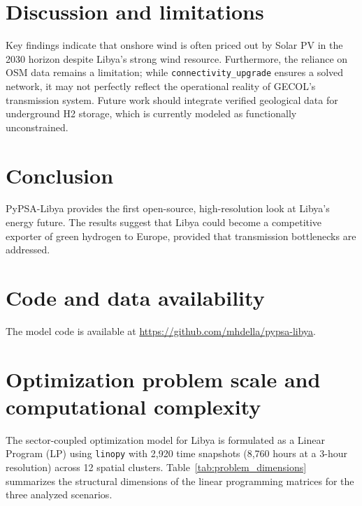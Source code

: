 \documentclass[preprint,12pt]{elsarticle}
\begin{document}
\section{Discussion and limitations}
Key findings indicate that onshore wind is often priced out by Solar PV in the 2030 horizon despite Libya's strong wind resource. Furthermore, the reliance on OSM data remains a limitation; while \texttt{connectivity\_upgrade} ensures a solved network, it may not perfectly reflect the operational reality of GECOL's transmission system. Future work should integrate verified geological data for underground H2 storage, which is currently modeled as functionally unconstrained.


\section{Conclusion}
PyPSA-Libya provides the first open-source, high-resolution look at Libya’s energy future. The results suggest that Libya could become a competitive exporter of green hydrogen to Europe, provided that transmission bottlenecks are addressed.


\section*{Code and data availability}
The model code is available at \url{https://github.com/mhdella/pypsa-libya}. 

\appendix
\section{Optimization problem scale and computational complexity}
\label{sec:appendix_problem_scale}

\setcounter{table}{0}
\renewcommand{\thetable}{A.\arabic{table}}
\setcounter{equation}{0}
\renewcommand{\theequation}{A.\arabic{equation}}
\setcounter{figure}{0}
\renewcommand{\thefigure}{A.\arabic{figure}}

The sector-coupled optimization model for Libya is formulated as a Linear Program (LP) using \texttt{linopy} with 2,920 time snapshots (8,760 hours at a 3-hour resolution) across 12 spatial clusters. Table~\ref{tab:problem_dimensions} summarizes the structural dimensions of the linear programming matrices for the three analyzed scenarios.
\end{document}
